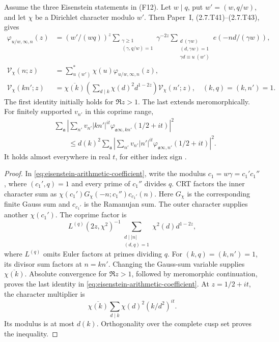 \begin{fact}\label{fact:eisenstein-hecke}
Assume the three Eisenstein statements in (F12).
Let $w\mid q$, put $w'=(w,q/w)$, and let $\chi$ be a Dirichlet
character modulo $w'$.
Then Paper~I, (2.7.T41)--(2.7.T43), gives
\begin{equation}\label{eq:eisenstein-arithmetic-coefficient}
 \begin{aligned}
 \varphi_{u/w,\infty,n}(z)
  &=(w'/(wq))^z\sum_{\substack{\gamma\ge1\\(\gamma,q/w)=1}}\gamma^{-2z}
 \sum_{\substack{d\ (\gamma w)\\(d,\gamma w)=1\\\gamma d\equiv u\ (w')}}
                      e(-nd/(\gamma w)),\\
 \mathcal V_\chi(n;z)&=\sum_{u\ (w')}^*\chi(u)
                         \varphi_{u/w,\infty,n}(z),\\
 \mathcal V_\chi(kn';z)
   &=\overline{\chi(k)}\left(\sum_{d\mid k}\chi(d)^2d^{1-2z}\right)
                           \mathcal V_\chi(n';z),
       \quad(k,q)=(k,n')=1.
 \end{aligned}
\end{equation}
The first identity initially holds for $\Re z>1$.
The last extends meromorphically.
For finitely supported $v_{n'}$ in this coprime range,
\begin{equation}\label{eq:eisenstein-hecke-loss}
 \begin{aligned}
 &\sum_{\mathfrak a}\left|\sum_{n'}v_{n'}|kn'|^{it}
       \varphi_{\mathfrak a\infty,kn'}(1/2+it)\right|^2\\
 &\qquad\le d(k)^2\sum_{\mathfrak a}\left|\sum_{n'}v_{n'}|n'|^{it}
       \varphi_{\mathfrak a\infty,n'}(1/2+it)\right|^2.
 \end{aligned}
\end{equation}
It holds almost everywhere in real $t$, for either index sign
\cite[(2.7.T41)--(2.7.T43), pp.~22--23]{PaperI}.
\end{fact}

\begin{proof}
In \eqref{eq:eisenstein-arithmetic-coefficient}, write the modulus
$c_1=w\gamma=c_1'c_1''$, where $(c_1',q)=1$ and every prime of
$c_1''$ divides $q$. CRT factors the inner character sum as
$\chi(c_1')G_\chi(-n;c_1'')c_{c_1'}(n)$. Here $G_\chi$ is the
corresponding finite Gauss sum and $c_{c_1'}$ is the Ramanujan sum.
The outer character supplies another $\chi(c_1')$. The coprime factor is
\[
 L^{(q)}(2z,\chi^2)^{-1}
 \sum_{\substack{d\mid |n|\\(d,q)=1}}\chi^2(d)d^{1-2z},
\]
where $L^{(q)}$ omits Euler factors at primes dividing $q$.
For $(k,q)=(k,n')=1$, its divisor sum factors at $n=kn'$.
Changing the Gauss-sum variable supplies $\overline{\chi(k)}$.
Absolute convergence for $\Re z>1$, followed by meromorphic continuation,
proves the last identity in \eqref{eq:eisenstein-arithmetic-coefficient}.
At $z=1/2+it$, the character multiplier is
\[
 \overline{\chi(k)}\sum_{d\mid k}\chi(d)^2(k/d^2)^{it}.
\]
Its modulus is at most $d(k)$.
Orthogonality over the complete cusp set proves the inequality.
\end{proof}

